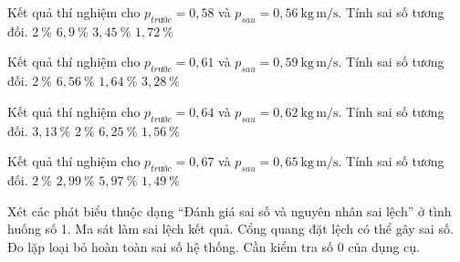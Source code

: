 \begin{ex}
Kết quả thí nghiệm cho $p_{trước}=0,58$ và $p_{sau}=0,56\ \mathrm{kg\,m/s}$. Tính sai số tương đối.
\choice
{$2\ \mathrm{\%}$}
{$6,9\ \mathrm{\%}$}
{\True $3,45\ \mathrm{\%}$}
{$1,72\ \mathrm{\%}$}
\end{ex}

\begin{ex}
Kết quả thí nghiệm cho $p_{trước}=0,61$ và $p_{sau}=0,59\ \mathrm{kg\,m/s}$. Tính sai số tương đối.
\choice
{$2\ \mathrm{\%}$}
{$6,56\ \mathrm{\%}$}
{$1,64\ \mathrm{\%}$}
{\True $3,28\ \mathrm{\%}$}
\end{ex}

\begin{ex}
Kết quả thí nghiệm cho $p_{trước}=0,64$ và $p_{sau}=0,62\ \mathrm{kg\,m/s}$. Tính sai số tương đối.
\choice
{\True $3,13\ \mathrm{\%}$}
{$2\ \mathrm{\%}$}
{$6,25\ \mathrm{\%}$}
{$1,56\ \mathrm{\%}$}
\end{ex}

\begin{ex}
Kết quả thí nghiệm cho $p_{trước}=0,67$ và $p_{sau}=0,65\ \mathrm{kg\,m/s}$. Tính sai số tương đối.
\choice
{$2\ \mathrm{\%}$}
{\True $2,99\ \mathrm{\%}$}
{$5,97\ \mathrm{\%}$}
{$1,49\ \mathrm{\%}$}
\end{ex}

\begin{ex}
Xét các phát biểu thuộc dạng “Đánh giá sai số và nguyên nhân sai lệch” ở tình huống số 1.
\choiceTF
{\True Ma sát làm sai lệch kết quả.}
{\True Cổng quang đặt lệch có thể gây sai số.}
{Đo lặp loại bỏ hoàn toàn sai số hệ thống.}
{\True Cần kiểm tra số 0 của dụng cụ.}
\end{ex}


